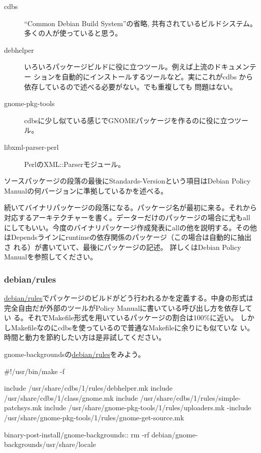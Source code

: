 \documentclass[mingoth,a4paper]{jsarticle}
\begin{document}
\begin{description}
 \item[cdbs]
            ``Common Debian Build System''の省略, 共有されているビルドシステム。
            多くの人が使っていると思う。
 \item[debhelper]
            いろいろパッケージビルドに役に立つツール。例えば上流のドキュメンテー
            ションを自動的にインストールするツールなど。実にこれがcdbs
            から依存しているので述べる必要がない。でも重複しても
            問題はない。
 \item[gnome-pkg-tools]
            cdbsに少し似ている感じでGNOMEパッケージを作るのに役に立つツー
            ル。
 \item[libxml-parser-perl]
            PerlのXML::Parserモジュール。
\end{description}

ソースパッケージの段落の最後にStandards-Versionという項目はDebian
Policy Manualの何バージョンに準拠しているかを述べる。

続いてバイナリパッケージの段落になる。パッケージ名が最初に来る。それから
対応するアーキテクチャーを書く。データーだけのパッケージの場合に尤もall
にしてもいい。今度のバイナリパッケージ作成発表にallの他を説明する。その他
はDependsラインにruntimeの依存関係のパッケージ（この場合は自動的に抽出さ
れる）が書いていて、最後にパッケージの記述。
詳しくはDebian Policy Manualを参照してください。

\subsubsection{debian/rules}

\url{debian/rules}でパッケージのビルドがどう行われるかを定義する。中身の形式は
完全自由だが外部のツールがPolicy Manualに書いている呼び出し方を依存してい
る。それでMakefile形式を用いているパッケージの割合は100\%に近い。
しかしMakefileなのにcdbsを使っているので普通なMakefileに余りにも似ていな
い。時間と動力を節約したい方は是非試してください。

gnome-backgroundsの\url{debian/rules}をみよう。

\begin{commandline}
#!/usr/bin/make -f

include /usr/share/cdbs/1/rules/debhelper.mk
include /usr/share/cdbs/1/class/gnome.mk
include /usr/share/cdbs/1/rules/simple-patchsys.mk
include /usr/share/gnome-pkg-tools/1/rules/uploaders.mk
-include /usr/share/gnome-pkg-tools/1/rules/gnome-get-source.mk

binary-post-install/gnome-backgrounds::
	rm -rf debian/gnome-backgrounds/usr/share/locale
\end{commandline}
\end{document}
